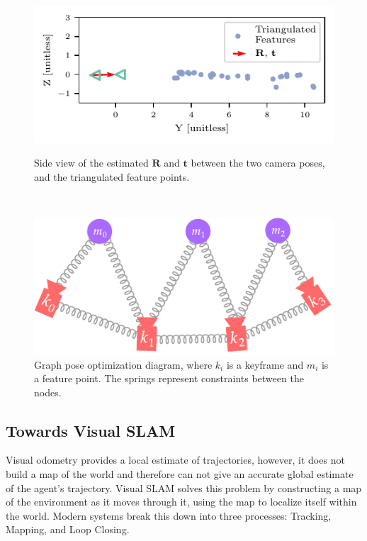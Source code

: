 \begin{figure}[h]
    \centering
    \captionsetup{format=plain}
    \begin{minipage}[t]{0.475\textwidth}
        \centering
        \includegraphics[width=\textwidth]{figures/3d_reconstruction.pdf}
        \caption{Side view of the estimated $\mathbf{R}$ and $\mathbf{t}$ between the two camera poses, and the triangulated feature points.}
        \label{fig:vo-3d-reconstruction}
    \end{minipage}\hfill%
    ~
    \begin{minipage}[t]{0.475\textwidth}
        \centering
        \includegraphics[width=\textwidth]{figures/gpo_diagram.pdf}
        \caption{Graph pose optimization diagram, where $k_i$ is a keyframe and $m_i$ is a feature point. The springs represent constraints between the nodes.}
        \label{fig:gpo-diagram}
    \end{minipage}%
\end{figure}

\subsection{Towards Visual SLAM}
\label{sec:towards-visual-slam}
Visual odometry provides a local estimate of trajectories, however, it does not build a map of the world and therefore can not give an accurate global estimate of the agent's trajectory. Visual SLAM solves this problem by constructing a map of the environment as it moves through it, using the map to localize itself within the world. Modern systems break this down into three processes: Tracking, Mapping, and Loop Closing.

